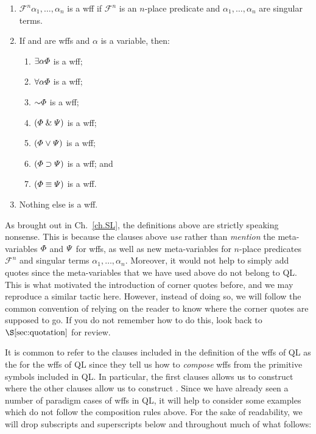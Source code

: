 \begin{enumerate}
  \item $\mathcal{F}^n\alpha_1,\ldots,\alpha_n$ is a wff if $\mathcal{F}^n$ is an $n$-place predicate and $\alpha_1,\ldots,\alpha_n$ are singular terms.
\item If \metaA{} and \metaB{} are wffs and $\alpha$ is a variable, then:
	\begin{enumerate}
      \item $\exists \alpha\varPhi{}$ is a wff;
      \item $\forall \alpha\varPhi{}$ is a wff;
      \item $\enot\metaA{}$ is a wff;
      \item $(\varPhi{}\mathrel\&\varPsi{})$ is a wff;
      \item $(\varPhi{}\mkern1mu\vee\mkern1mu\varPsi{})$ is a wff;
      \item $(\varPhi{}\supset\varPsi{})$ is a wff; and
      \item $(\varPhi{}\equiv\varPsi{})$ is a wff.
	\end{enumerate}
\item Nothing else is a wff.
\end{enumerate}

As brought out in Ch.~\ref{ch.SL}, the definitions above are strictly speaking nonsense.
This is because the clauses above \textit{use} rather than \textit{mention} the meta-variables $\varPhi$ and $\varPsi$ for wffs, as well as new meta-variables for $n$-place predicates $\mathcal{F}^n$ and singular terms $\alpha_1,\ldots,\alpha_n$.
Moreover, it would not help to simply add quotes since the meta-variables that we have used above do not belong to QL.
This is what motivated the introduction of corner quotes before, and we may reproduce a similar tactic here.
However, instead of doing so, we will follow the common convention of relying on the reader to know where the corner quotes are supposed to go.
If you do not remember how to do this, look back to $\S\ref{sec:quotation}$ for review. 

It is common to refer to the clauses included in the definition of the wffs of QL as the  for the wffs of QL since they tell us how to \textit{compose} wffs from the primitive symbols included in QL.
In particular, the first clauses allows us to construct  where the other clauses allow us to construct .
Since we have already seen a number of paradigm cases of wffs in QL, it will help to consider some examples which do not follow the composition rules above.
For the sake of readability, we will drop subscripts and superscripts below and throughout much of what follows:

